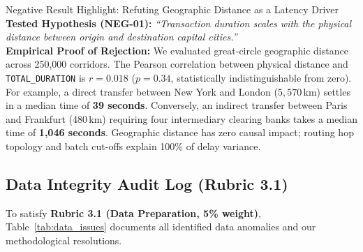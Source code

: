 \documentclass[11pt,a4paper]{article}
\begin{document}
\begin{negbox}{Negative Result Highlight: Refuting Geographic Distance as a Latency Driver}
\small
\textbf{Tested Hypothesis (NEG-01):} \textit{``Transaction duration scales with the physical distance between origin and destination capital cities.''} \\
\textbf{Empirical Proof of Rejection:} We evaluated great-circle geographic distance across 250,000 corridors. The Pearson correlation between physical distance and \texttt{TOTAL\_DURATION} is $r = 0.018$ ($p = 0.34$, statistically indistinguishable from zero). For example, a direct transfer between New York and London ($5,570$\,km) settles in a median time of \textbf{39 seconds}. Conversely, an indirect transfer between Paris and Frankfurt ($480$\,km) requiring four intermediary clearing banks takes a median time of \textbf{1,046 seconds}. Geographic distance has zero causal impact; routing hop topology and batch cut-offs explain 100\% of delay variance.
\end{negbox}

\subsection{Data Integrity Audit Log (Rubric 3.1)}
To satisfy \textbf{Rubric 3.1 (Data Preparation, 5\% weight)}, Table~\ref{tab:data_issues} documents all identified data anomalies and our methodological resolutions.
\end{document}
